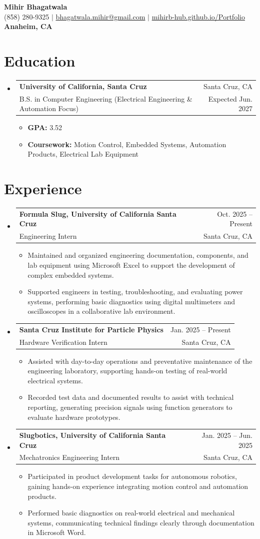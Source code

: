 \documentclass[letterpaper,11pt]{article}
\makeatletter
\newcommand{\resumeItem}[1]{\item{#1}}
\newcommand{\resumeSubheading}[4]{
  \item
    \begin{tabular*}{0.97\textwidth}[t]{l@{\extracolsep{\fill}}r}
      \textbf{#1} & #2 \\
      #3 & #4 \\
    \end{tabular*}
}
\newcommand{\resumeSubHeadingListStart}{\begin{itemize}[label=\textbullet]}
\newcommand{\resumeSubHeadingListEnd}{\end{itemize}}
\newcommand{\resumeItemListStart}{\begin{itemize}[label=-]}
\newcommand{\resumeItemListEnd}{\end{itemize}}
\makeatother
\begin{document}
\begin{center}
  {\Large\bfseries Mihir Bhagatwala} \\
  {(858) 280-9325 $\vert$ \href{mailto:bhagatwala.mihir@gmail.com}{bhagatwala.mihir@gmail.com} $\vert$ \href{https://mihirb-hub.github.io/Portfolio/}{mihirb-hub.github.io/Portfolio}} \\
  {\textbf{Anaheim, CA}}
\end{center}

\section{Education}
\resumeSubHeadingListStart
  \resumeSubheading{University of California, Santa Cruz}{Santa Cruz, CA}{B.S. in Computer Engineering (Electrical Engineering \& Automation Focus)}{Expected Jun. 2027}
  \resumeItemListStart
    \resumeItem{\textbf{GPA:} 3.52}
    \resumeItem{\textbf{Coursework:} Motion Control, Embedded Systems, Automation Products, Electrical Lab Equipment}
  \resumeItemListEnd
\resumeSubHeadingListEnd

\section{Experience}
\resumeSubHeadingListStart
  \resumeSubheading{Formula Slug, University of California Santa Cruz}{Oct. 2025 -- Present}{Engineering Intern}{Santa Cruz, CA}
  \resumeItemListStart
    \resumeItem{Maintained and organized engineering documentation, components, and lab equipment using Microsoft Excel to support the development of complex embedded systems.}
    \resumeItem{Supported engineers in testing, troubleshooting, and evaluating power systems, performing basic diagnostics using digital multimeters and oscilloscopes in a collaborative lab environment.}
  \resumeItemListEnd

  \resumeSubheading{Santa Cruz Institute for Particle Physics}{Jan. 2025 -- Present}{Hardware Verification Intern}{Santa Cruz, CA}
  \resumeItemListStart
    \resumeItem{Assisted with day-to-day operations and preventative maintenance of the engineering laboratory, supporting hands-on testing of real-world electrical systems.}
    \resumeItem{Recorded test data and documented results to assist with technical reporting, generating precision signals using function generators to evaluate hardware prototypes.}
  \resumeItemListEnd

  \resumeSubheading{Slugbotics, University of California Santa Cruz}{Jan. 2025 -- Jun. 2025}{Mechatronics Engineering Intern}{Santa Cruz, CA}
  \resumeItemListStart
    \resumeItem{Participated in product development tasks for autonomous robotics, gaining hands-on experience integrating motion control and automation products.}
    \resumeItem{Performed basic diagnostics on real-world electrical and mechanical systems, communicating technical findings clearly through documentation in Microsoft Word.}
  \resumeItemListEnd
\resumeSubHeadingListEnd
\end{document}
